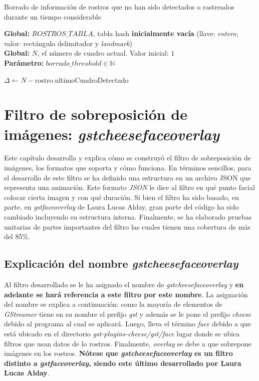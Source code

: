 \documentclass[a4paper,openright,12pt]{report}
\begin{document}
\begin{algorithm}
  \caption{Borrado de información de rostros que no han sido detectados o
      rastreados durante un tiempo considerable}
  \label{alg:delete}
  \textbf{Global: }$ROSTROS\_TABLA$, tabla hash \textbf{inicialmente vacía}
      (llave: \textit{entero}, valor: rectángulo delimitador y \textit{landmark})\\
  \textbf{Global: }$N$, el número de cuadro actual. Valor inicial: $1$\\
  \textbf{Parámetro: }$borrado\_threshold \in \mathbb{N}$\\
  \begin{algorithmic}[1]
        \State $\Delta\gets N - $rostro.ultimoCuadroDetectado
          \State {}
        \EndIf
      \EndFor
    \EndProcedure
  \end{algorithmic}
\end{algorithm}

\chapter{Filtro de sobreposición de imágenes: \textit{gstcheesefaceoverlay}}
Este capítulo desarrolla y explica cómo se construyó el filtro de sobreposición
de imágenes, los formatos que soporta y cómo funciona. En términos
sencillos, para el desarrollo de este filtro se ha definido una estructura en
un archivo JSON que representa una animación. Este formato \textit{JSON} le dice
al filtro en qué punto facial colocar cierta imagen y con qué duración. Si bien
el filtro ha sido basado, en parte, en \textit{gstfaceoverlay} de
Laura Lucas Alday, gran parte del código ha sido cambiado incluyendo su
estructura interna. Finalmente, se ha elaborado pruebas unitarias de partes
importantes del filtro las cuales tienen una cobertura de más del 85\%.\\

\section{Explicación del nombre \textit{gstcheesefaceoverlay}}
Al filtro desarrollado se le ha asignado el nombre de
\textit{gstcheesefaceoverlay} y \textbf{en adelante se hará referencia a este
filtro por este nombre}. La asignación del nombre se explica a continuación:
como la mayoría de elementos de \textit{GStreamer} tiene en su nombre el prefijo
\textit{gst} y además se le pone el prefijo \textit{cheese} debido al programa
al cual se aplicará. Luego, lleva el término \textit{face} debido a que está
ubicado en el directorio \textit{gst-plugins-cheese/gst/face} lugar donde se
ubica filtros que usan datos de lo rostros. Finalmente, \textit{overlay} se debe
a que sobrepone imágenes en los rostros. \textbf{Nótese que
\textit{gstcheesefaceoverlay} es un filtro distinto a \textit{gstfaceoverlay},
siendo este último desarrollado por Laura Lucas Alday}.\\
\end{document}

